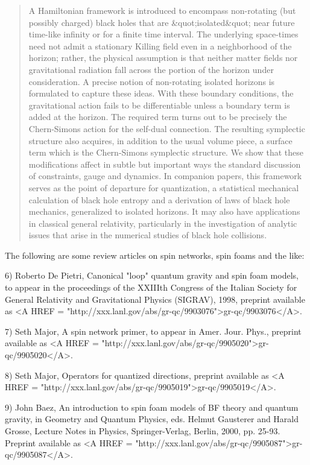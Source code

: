\begin{quote}
A Hamiltonian framework is introduced to encompass non-rotating (but
possibly charged) black holes that are &quot;isolated&quot; near future
time-like infinity or for a finite time interval.  The underlying
space-times need not admit a stationary Killing field even in a
neighborhood of the horizon; rather, the physical assumption is that
neither matter fields nor gravitational radiation fall across the
portion of the horizon under consideration.  A precise notion of
non-rotating isolated horizons is formulated to capture these ideas.
With these boundary conditions, the gravitational action fails to be
differentiable unless a boundary term is added at the horizon.  The
required term turns out to be precisely the Chern-Simons action for the
self-dual connection.  The resulting symplectic structure also acquires,
in addition to the usual volume piece, a surface term which is the
Chern-Simons symplectic structure.  We show that these modifications
affect in subtle but important ways the standard discussion of
constraints, gauge and dynamics.  In companion papers, this framework
serves as the point of departure for quantization, a statistical
mechanical calculation of black hole entropy and a derivation of laws of
black hole mechanics, generalized to isolated horizons.  It may also have
applications in classical general relativity, particularly in the
investigation of analytic issues that arise in the numerical studies
of black hole collisions.
\end{quote}
    

The following are some review articles on spin networks, spin
foams and the like:


 6) Roberto De Pietri, Canonical "loop" quantum gravity and spin
foam models, to appear in the proceedings of the XXIIIth Congress of the
Italian Society for General Relativity and Gravitational Physics
(SIGRAV), 1998, preprint available as <A HREF =
"http://xxx.lanl.gov/abs/gr-qc/9903076">gr-qc/9903076</A>.


 7) Seth Major, A spin network primer, to appear in Amer. Jour. Phys.,
preprint available as <A HREF =
"http://xxx.lanl.gov/abs/gr-qc/9905020">gr-qc/9905020</A>.

8) Seth Major, Operators for quantized directions, preprint available
as <A HREF = "http://xxx.lanl.gov/abs/gr-qc/9905019">gr-qc/9905019</A>.

9) John Baez, An introduction to spin foam models of BF theory and quantum
gravity, in Geometry and Quantum Physics, eds. Helmut Gausterer and
Harald Grosse, Lecture Notes in Physics, Springer-Verlag, Berlin, 2000,
pp. 25-93.  Preprint available as <A HREF =
"http://xxx.lanl.gov/abs/gr-qc/9905087">gr-qc/9905087</A>.


